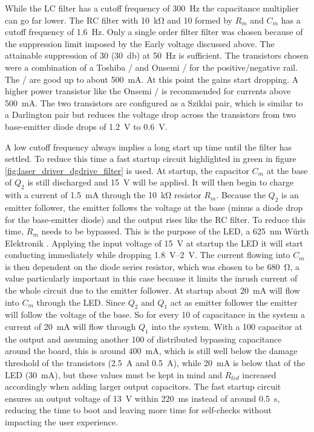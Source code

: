 While the LC filter has a cutoff frequency of \qty{300}{\Hz} the capacitance multiplier can go far lower. The RC filter with \qty{10}{\kilo\ohm} and \qty{10}{\uF} formed by $R_m$ and $C_m$ has a cutoff frequency of \qty{1.6}{\Hz}. Only a single order filter filter was chosen because of the suppression limit imposed by the Early voltage discussed above. The attainable suppression of 30 (\qty{30}{\decibel}) at \qty{50}{\Hz} is sufficient. The transistors chosen were a combination of a Toshiba / and Onsemi / for the positive/negative rail. The / are good up to about \qty{500}{\mA}. At this point the gains start dropping. A higher power transistor like the Onsemi / is recommended for currents above \qty{500}{\mA}. The two transistors are configured as a Sziklai pair, which is similar to a Darlington pair but reduces the voltage drop across the transistors from two base-emitter diode drops of \qty{1.2}{\V} to \qty{0.6}{\V}.

A low cutoff frequency always implies a long start up time until the filter has settled. To reduce this time a fast startup circuit highlighted in green in figure \ref{fig:laser_driver_dgdrive_filter} is used. At startup, the capacitor $C_m$ at the base of $Q_2$ is still discharged and \qty{15}{\V} will be applied. It will then begin to charge with a current of \qty{1.5}{\mA} through the \qty{10}{\kilo\ohm} resistor $R_m$. Because the $Q_2$ is an emitter follower, the emitter follows the voltage at the base (minus a diode drop for the base-emitter diode) and the output rises like the RC filter. To reduce this time, $R_m$ needs to be bypassed. This is the purpose of the LED, a \qty{625}{\nm} Würth Elektronik . Applying the input voltage of \qty{15}{\V} at startup the LED it will start conducting immediately while dropping \qtyrange[range-units = single]{1.8}{2}{\V}. The current flowing into $C_m$ is then dependent on the diode series resistor, which was chosen to be \qty{680}{\ohm}, a value particularly important in this case because it limits the inrush current of the whole circuit due to the emitter follower. At startup about \qty{20}{\mA} will flow into $C_m$ through the LED. Since $Q_2$ and $Q_1$ act as emitter follower the emitter will follow the voltage of the base. So for every \qty{10}{\uF} of capacitance in the system a current of \qty{20}{\mA} will flow through $Q_1$ into the system. With a \qty{100}{\uF} capacitor at the output and assuming another \qty{100}{\uF} of distributed bypassing capacitance around the board, this is around \qty{400}{\mA}, which is still well below the damage threshold of the transistors (\qty{2.5}{\A} and \qty{0.5}{\A}), while \qty{20}{\mA} is below that of the LED (\qty{30}{\mA}), but these values must be kept in mind and $R_{led}$ increased accordingly when adding larger output capacitors. The fast startup circuit ensures an output voltage of \qty{13}{\V} within \qty{220}{\ms} instead of around \qty{0.5}{\second}, reducing the time to boot and leaving more time for self-checks without impacting the user experience.

